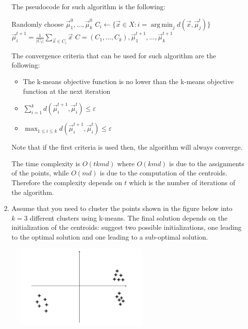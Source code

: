 \documentclass[a4paper,11pt,oneside]{book}
\DeclareMathOperator*{\argmin}{arg\,min}
\begin{document}
\begin{enumerate}
\begin{solution}
    The pseudocode for such algorithm is the following:
    
    \begin{algorithmic}[1]
    \State Randomly choose $\vec{\mu}_1^0,...,\vec{\mu}_k^0$
           \State $C_i \gets \{\vec{x} \in X : i = \argmin_j d(\vec{x},\vec{\mu}_j^t)\}$
       \EndFor
           \State $\vec{\mu}_i^{t+1} = \frac{1}{|C_i|}\sum_{\vec{x}\in C_i} \vec{x}$
       \EndFor
           \State \Return $C = (C_1,...,C_k), \vec{\mu}_1^{t+1},...,\vec{\mu}_k^{t+1}$
       \EndIf
    \EndFor
    \end{algorithmic}
    
    The convergence criteria that can be used for such algorithm are the following:
    \begin{itemize}
    \item The k-means objective function is no lower than the k-means objective function at the next iteration
    \item $\sum_{i=1}^k d(\vec{\mu}_i^{t+1},\vec{\mu}_i^t) \leq \varepsilon$
    \item $\max_{1\leq i\leq k}d(\vec{\mu}_i^{t+1},\vec{\mu}_i^t) \leq \varepsilon$
    \end{itemize}
    
    Note that if the first criteria is used then, the algorithm will always converge.

    The time complexity is $O(tkmd)$ where $O(kmd)$ is due to the assignments of the points, while $O(md)$ is
    due to the computation of the centroids. Therefore the complexity depends on $t$ which is the number of
    iterations of the algorithm.
    \end{solution}

\clearpage
\item Assume that you need to cluster the points shown in the figure below into $k = 3$ different clusters using k-means. The final solution depends on the initialization of the centroids: suggest two possible initializations, one leading to the optimal solution and one leading to a sub-optimal solution.
\end{enumerate}
\begin{figure}[H]
    \centering
    \includegraphics[width=0.6\textwidth,height=0.6\textheight,keepaspectratio]{images/4_29_June_2020.png}
 \end{figure}
\end{document}

